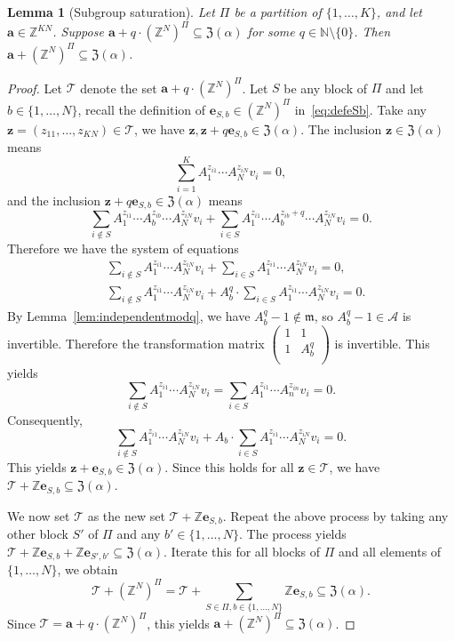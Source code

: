 \documentclass[letterpaper, 11pt, thm-restate]{article}
\numberwithin{equation}{section}
\newcommand{\Z}{\mathbb{Z}}
\newcommand{\N}{\mathbb{N}}
\newcommand{\mT}{\mathcal{T}}
\newcommand{\mA}{\mathcal{A}}
\newcommand{\mZ}{\mathfrak{Z}}
\newcommand{\ba}{\boldsymbol{a}}
\newcommand{\be}{\boldsymbol{e}}
\newcommand{\bz}{\boldsymbol{z}}
\newcommand{\frm}{\mathfrak{m}}
\newtheorem{lem}[thrm]{Lemma}
\theoremstyle{definition}
\theoremstyle{definition}
\theoremstyle{definition}
\begin{document}
\begin{lem}[Subgroup saturation]\label{lem:saturation}
    Let $\Pi$ be a partition of $\{1, \ldots, K\}$, and let $\ba \in \Z^{KN}$.
    Suppose $\ba + q \cdot (\Z^N)^{\Pi} \subseteq \mZ(\alpha)$ for some $q \in \N \setminus \{0\}$. Then $\ba +  (\Z^N)^{\Pi} \subseteq \mZ(\alpha)$.
\end{lem}
\begin{proof}
    Let $\mT$ denote the set $\ba + q \cdot(\Z^N)^{\Pi}$.
    Let $S$ be any block of $\Pi$ and let $b \in \{1, \ldots, N\}$, recall the definition of $\be_{S, b} \in (\Z^N)^{\Pi}$ in~\eqref{eq:defeSb}.
    Take any $\bz = (z_{11}, \ldots, z_{KN}) \in \mT$, we have $\bz, \bz + q\be_{S, b} \in \mZ(\alpha)$.
    The inclusion $\bz \in \mZ(\alpha)$ means
    \begin{equation*}
    \sum_{i = 1}^K A_1^{z_{i1}} \cdots A_N^{z_{iN}} v_i = 0,
    \end{equation*}
    and the inclusion $\bz+ q\be_{S, b} \in \mZ(\alpha)$ means
    \[
    \sum_{i \notin S} A_1^{z_{i1}} \cdots A_b^{z_{ib}} \cdots A_N^{z_{iN}} v_i + \sum_{i \in S} A_1^{z_{i1}} \cdots A_b^{z_{ib} + q} \cdots A_N^{z_{iN}} v_i= 0.
    \]
    Therefore we have the system of equations
    \begin{align*}
    & \sum_{i \notin S} A_1^{z_{i1}} \cdots A_N^{z_{iN}} v_i + \sum_{i \in S} A_1^{z_{i1}} \cdots A_N^{z_{iN}} v_i= 0, \\
    & \sum_{i \notin S} A_1^{z_{i1}} \cdots A_N^{z_{iN}} v_i + A_b^q \cdot \sum_{i \in S} A_1^{z_{i1}} \cdots A_N^{z_{iN}} v_i= 0.
    \end{align*}
    By Lemma~\ref{lem:independentmodq}, we have $A_b^q - 1 \not\in \frm$, so $A_b^q - 1 \in \mA$ is invertible.
    Therefore the transformation matrix
    $
    \begin{pmatrix}
        1 & 1 \\
        1 & A_b^q \\
    \end{pmatrix}
    $
    is invertible.
    This yields
    \[
    \sum_{i \notin S} A_1^{z_{i1}} \cdots A_N^{z_{iN}} v_i = \sum_{i \in S} A_1^{z_{i1}} \cdots A_n^{z_{in}} v_i = 0.
    \]
    Consequently,
    \[
    \sum_{i \notin S} A_1^{z_{i1}} \cdots A_N^{z_{iN}} v_i + A_b \cdot \sum_{i \in S} A_1^{z_{i1}} \cdots A_N^{z_{iN}} v_i= 0.
    \]
    This yields $\bz + \be_{S, b} \in \mZ(\alpha)$.
    Since this holds for all $\bz \in \mT$, we have $\mT + \Z \be_{S, b} \subseteq \mZ(\alpha)$.

    We now set $\mT$ as the new set $\mT + \Z \be_{S, b}$.
    Repeat the above process by taking any other block $S'$ of $\Pi$ and any $b' \in \{1, \ldots, N\}$.
    The process yields $\mT + \Z \be_{S, b} + \Z \be_{S', b'} \subseteq \mZ(\alpha)$.
    Iterate this for all blocks of $\Pi$ and all elements of $\{1, \ldots, N\}$, we obtain 
    \[
    \mT + (\Z^N)^{\Pi} = \mT + \sum_{S \in \Pi, b \in \{1, \ldots, N\}} \Z \be_{S, b} \subseteq \mZ(\alpha).
    \]
    Since $\mT = \ba + q \cdot(\Z^N)^{\Pi}$, this yields $\ba + (\Z^N)^{\Pi} \subseteq \mZ(\alpha)$.
\end{proof}
\end{document}
